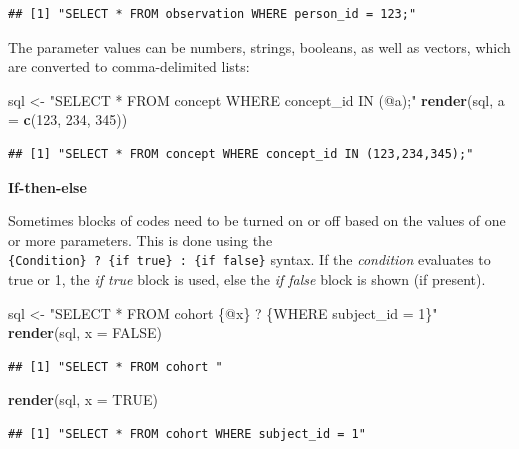 \documentclass[]{book}
\newenvironment{Shaded}{\begin{snugshade}}{\end{snugshade}}
\newcommand{\KeywordTok}[1]{\textcolor[rgb]{0.13,0.29,0.53}{\textbf{#1}}}
\newcommand{\DataTypeTok}[1]{\textcolor[rgb]{0.13,0.29,0.53}{#1}}
\newcommand{\DecValTok}[1]{\textcolor[rgb]{0.00,0.00,0.81}{#1}}
\newcommand{\StringTok}[1]{\textcolor[rgb]{0.31,0.60,0.02}{#1}}
\newcommand{\OtherTok}[1]{\textcolor[rgb]{0.56,0.35,0.01}{#1}}
\newcommand{\NormalTok}[1]{#1}
\begin{document}
\begin{verbatim}
## [1] "SELECT * FROM observation WHERE person_id = 123;"
\end{verbatim}

The parameter values can be numbers, strings, booleans, as well as
vectors, which are converted to comma-delimited lists:

\begin{Shaded}
\begin{Highlighting}[]
\NormalTok{sql <-}\StringTok{ "SELECT * FROM concept WHERE concept_id IN (@a);"}
\KeywordTok{render}\NormalTok{(sql, }\DataTypeTok{a =} \KeywordTok{c}\NormalTok{(}\DecValTok{123}\NormalTok{, }\DecValTok{234}\NormalTok{, }\DecValTok{345}\NormalTok{))}
\end{Highlighting}
\end{Shaded}

\begin{verbatim}
## [1] "SELECT * FROM concept WHERE concept_id IN (123,234,345);"
\end{verbatim}

\textbf{If-then-else}

Sometimes blocks of codes need to be turned on or off based on the
values of one or more parameters. This is done using the
\texttt{\{Condition\}\ ?\ \{if\ true\}\ :\ \{if\ false\}} syntax. If the
\emph{condition} evaluates to true or 1, the \emph{if true} block is
used, else the \emph{if false} block is shown (if present).

\begin{Shaded}
\begin{Highlighting}[]
\NormalTok{sql <-}\StringTok{ "SELECT * FROM cohort \{@x\} ? \{WHERE subject_id = 1\}"}
\KeywordTok{render}\NormalTok{(sql, }\DataTypeTok{x =} \OtherTok{FALSE}\NormalTok{)}
\end{Highlighting}
\end{Shaded}

\begin{verbatim}
## [1] "SELECT * FROM cohort "
\end{verbatim}

\begin{Shaded}
\begin{Highlighting}[]
\KeywordTok{render}\NormalTok{(sql, }\DataTypeTok{x =} \OtherTok{TRUE}\NormalTok{)}
\end{Highlighting}
\end{Shaded}

\begin{verbatim}
## [1] "SELECT * FROM cohort WHERE subject_id = 1"
\end{verbatim}
\end{document}
